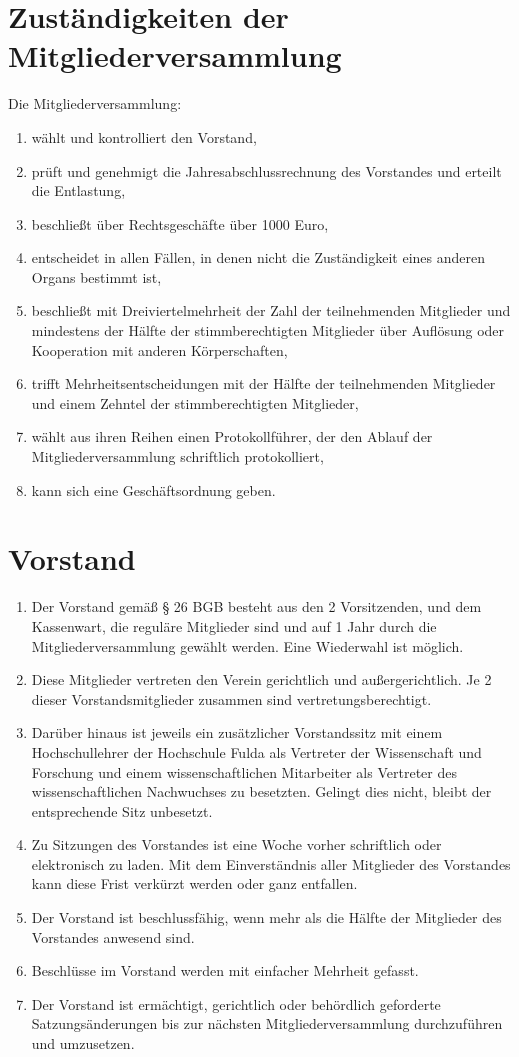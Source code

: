 \documentclass[ngerman]{article}
\begin{document}
\section{Zuständigkeiten der Mitgliederversammlung}
Die Mitgliederversammlung:
\begin{enumerate}
\item wählt und kontrolliert den Vorstand,
\item prüft und genehmigt die Jahresabschlussrechnung des Vorstandes und erteilt die Entlastung,
\item beschließt über Rechtsgeschäfte über 1000 Euro,
\item entscheidet in allen Fällen, in denen nicht die Zuständigkeit eines anderen Organs bestimmt ist,
\item beschließt mit Dreiviertelmehrheit der Zahl der teilnehmenden Mitglieder und mindestens der Hälfte der stimmberechtigten Mitglieder über Auflösung oder Kooperation mit anderen Körperschaften,
\item trifft Mehrheitsentscheidungen mit der Hälfte der teilnehmenden Mitglieder und einem Zehntel der stimmberechtigten Mitglieder,
\item wählt aus ihren Reihen einen Protokollführer, der den Ablauf der Mitgliederversammlung schriftlich protokolliert,
\item kann sich eine Geschäftsordnung geben.
\end{enumerate}

\section{Vorstand}
\begin{enumerate}
\item Der Vorstand gemäß § 26 BGB besteht aus den 2 Vorsitzenden, und dem Kassenwart, die reguläre Mitglieder sind und auf 1 Jahr durch die Mitgliederversammlung gewählt werden. Eine Wiederwahl ist möglich.
\item Diese Mitglieder vertreten den Verein gerichtlich und außergerichtlich. Je 2 dieser Vorstandsmitglieder zusammen sind vertretungsberechtigt.
\item Darüber hinaus ist jeweils ein zusätzlicher Vorstandssitz mit einem Hochschullehrer der Hochschule Fulda als Vertreter der Wissenschaft
und Forschung und einem wissenschaftlichen Mitarbeiter als Vertreter des wissenschaftlichen Nachwuchses zu besetzten. Gelingt dies nicht,
bleibt der entsprechende Sitz unbesetzt.
\item Zu Sitzungen des Vorstandes ist eine Woche vorher schriftlich oder elektronisch zu laden. Mit dem Einverständnis aller Mitglieder des
Vorstandes kann diese Frist verkürzt werden oder ganz entfallen.
\item Der Vorstand ist beschlussfähig, wenn mehr als die Hälfte der Mitglieder des Vorstandes anwesend sind.
\item Beschlüsse im Vorstand werden mit einfacher Mehrheit gefasst.
\item Der Vorstand ist ermächtigt, gerichtlich oder behördlich geforderte Satzungsänderungen bis zur nächsten Mitgliederversammlung durchzuführen und umzusetzen.
\end{enumerate}
\end{document}
